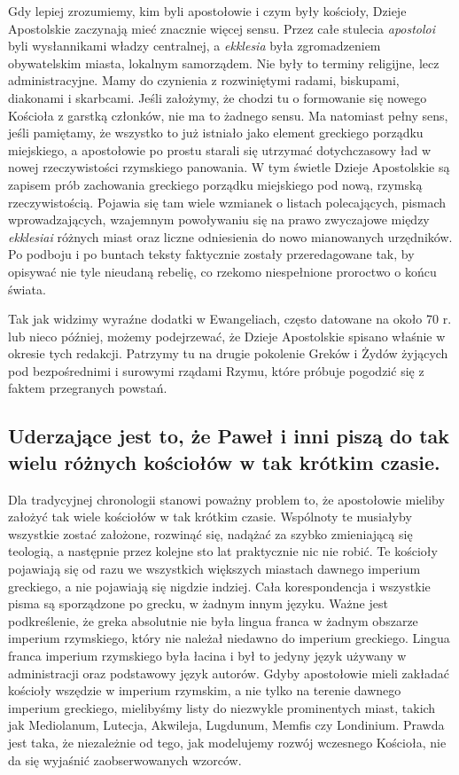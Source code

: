 Gdy lepiej zrozumiemy, kim byli apostołowie i czym były kościoły, Dzieje Apostolskie zaczynają mieć znacznie więcej sensu.
Przez całe stulecia \textit{apostoloi} byli wysłannikami władzy centralnej, a \textit{ekklesia} była zgromadzeniem obywatelskim miasta, lokalnym samorządem.
Nie były to terminy religijne, lecz administracyjne.
Mamy do czynienia z rozwiniętymi radami, biskupami, diakonami i skarbcami.
Jeśli założymy, że chodzi tu o formowanie się nowego Kościoła z garstką członków, nie ma to żadnego sensu.
Ma natomiast pełny sens, jeśli pamiętamy, że wszystko to już istniało jako element greckiego porządku miejskiego, a apostołowie po prostu starali się utrzymać dotychczasowy ład w nowej rzeczywistości rzymskiego panowania.
W tym świetle Dzieje Apostolskie są zapisem prób zachowania greckiego porządku miejskiego pod nową, rzymską rzeczywistością.
Pojawia się tam wiele wzmianek o listach polecających, pismach wprowadzających, wzajemnym powoływaniu się na prawo zwyczajowe między \textit{ekklesiai} różnych miast oraz liczne odniesienia do nowo mianowanych urzędników.
Po podboju i po buntach teksty faktycznie zostały przeredagowane tak, by opisywać nie tyle nieudaną rebelię, co rzekomo niespełnione proroctwo o końcu świata.

Tak jak widzimy wyraźne dodatki w Ewangeliach, często datowane na około 70 r. lub nieco później, możemy podejrzewać, że Dzieje Apostolskie spisano właśnie w okresie tych redakcji.
Patrzymy tu na drugie pokolenie Greków i Żydów żyjących pod bezpośrednimi i surowymi rządami Rzymu, które próbuje pogodzić się z faktem przegranych powstań.

\subsection{Uderzające jest to, że Paweł i inni piszą do tak wielu różnych kościołów w tak krótkim czasie.}\label{subsec:what-is-quite-striking-is-that-paul-and-others-write-to-so-many-different-churches-over-the-short-period-of-time.}

Dla tradycyjnej chronologii stanowi poważny problem to, że apostołowie mieliby założyć tak wiele kościołów w tak krótkim czasie.
Wspólnoty te musiałyby wszystkie zostać założone, rozwinąć się, nadążać za szybko zmieniającą się teologią, a następnie przez kolejne sto lat praktycznie nic nie robić.
Te kościoły pojawiają się od razu we wszystkich większych miastach dawnego imperium greckiego, a nie pojawiają się nigdzie indziej.
Cała korespondencja i wszystkie pisma są sporządzone po grecku, w żadnym innym języku.
Ważne jest podkreślenie, że greka absolutnie nie była lingua franca w żadnym obszarze imperium rzymskiego, który nie należał niedawno do imperium greckiego.
Lingua franca imperium rzymskiego była łacina i był to jedyny język używany w administracji oraz podstawowy język autorów.
Gdyby apostołowie mieli zakładać kościoły wszędzie w imperium rzymskim, a nie tylko na terenie dawnego imperium greckiego, mielibyśmy listy do niezwykle prominentych miast, takich jak Mediolanum, Lutecja, Akwileja, Lugdunum, Memfis czy Londinium.
Prawda jest taka, że niezależnie od tego, jak modelujemy rozwój wczesnego Kościoła, nie da się wyjaśnić zaobserwowanych wzorców.

